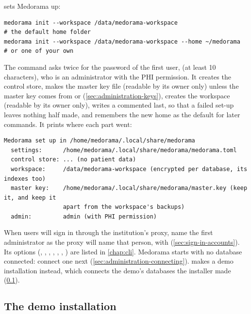  sets Medorama up:
\begin{lstlisting}[style=shell]
medorama init --workspace /data/medorama-workspace                    # the default home folder
medorama init --workspace /data/medorama-workspace --home ~/medorama  # or one of your own
\end{lstlisting}
The command asks twice for the password of the first user,  (at least 10
characters), who is an administrator with the PHI permission. It creates the control store,
makes the master key file  (readable by its owner only) unless the
master key comes from  or 
(\cref{sec:administration-keys}), creates the workspace (readable by its owner only), writes a commented  last, so that a failed set-up leaves
nothing half made, and remembers the new home as the default for later commands. It prints
where each part went:
\begin{lstlisting}
Medorama set up in /home/medorama/.local/share/medorama
  settings:      /home/medorama/.local/share/medorama/medorama.toml
  control store: ... (no patient data)
  workspace:     /data/medorama-workspace (encrypted per database, its indexes too)
  master key:    /home/medorama/.local/share/medorama/master.key (keep it, and keep it
                 apart from the workspace's backups)
  admin:         admin (with PHI permission)
\end{lstlisting}
When users will sign in through the institution's proxy, name the first administrator as the
proxy will name that person, with  (\cref{sec:sign-in-accounts}). Its options
(, , ,
, , ,
) are listed in \cref{chap:cli}. Medorama starts with no database connected:
connect one next (\cref{sec:administration-connecting}).  makes a demo
installation instead, which connects the demo's databases the installer made
(\cref{sec:administration-demo}).

\subsection{The demo installation}
\label{sec:administration-demo}

